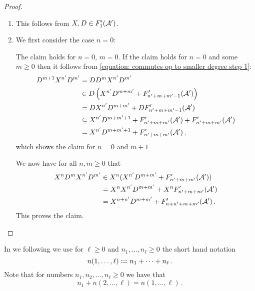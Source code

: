 \begin{proof}
  \leavevmode
  \begin{enumerate}
    \item
      This follows from $X, D \in F'_1(\mathcal{A}')$.
    \item
      We first consider the case $n = 0$:
      
      The claim holds for $n = 0$, $m = 0$.
      If the claim holds for $n = 0$ and some $m \geq 0$ then it follows from \eqref{equation: commutes op to smaller degree step 1}:
      \begin{align*}
                    D^{m+1} X^{n'} D^{m'}
        &=          D D^{m} X^{n'} D^{m'}                                         \\
        &\in        D \left( X^{n'} D^{m+m'} + F'_{n'+m+m'-1}(\mathcal{A}') \right)    \\
        &=          D X^{n'} D^{m+m'} + D F'_{n'+m+m'-1}(\mathcal{A}')                 \\
        &\subseteq    X^{n'} D^{m+m'+1}
                    + F'_{n'+m+m'}(\mathcal{A}')
                    + F'_{n'+m+m'}(\mathcal{A}')                                       \\
        &=            X^{n'} D^{m+m'+1}
                    + F'_{n'+m+m'}(\mathcal{A}') \,,
      \end{align*}
      which shows the claim for $n = 0$ and $m+1$
      
      We now have for all $n, m \geq 0$ that
      \begin{align*}
              X^n D^m X^{n'} D^{m'}
        &\in  X^n ( X^{n'} D^{m + m'} + F'_{n' + m + m'}(\mathcal{A}') ) \\
        &=    X^n X^{n'} D^{m + m'} + X^n F'_{n' + m + m'}(\mathcal{A}') \\
        &=    X^{n + n'} D^{m + m'} + F'_{n + n' + m + m'}(\mathcal{A}') \,.
      \end{align*}
      This proves the claim.
    \qedhere
  \end{enumerate}
\end{proof}


\begin{conventions}
  In we following we use for $\ell \geq 0$ and $n_1, \dotsc, n_\ell \geq 0$ the short hand notation
  \[
              n(1,\dotsc,\ell)
    \coloneqq  n_1 + \dotsb + n_\ell \,.
  \]
  Note that for numbers $n_1, n_2, \dotsc, n_\ell \geq 0$ we have that
  \[
      n_1 + n(2, \dotsc, \ell)
    = n(1, \dotsc, \ell) \,.
  \]
\end{conventions}


